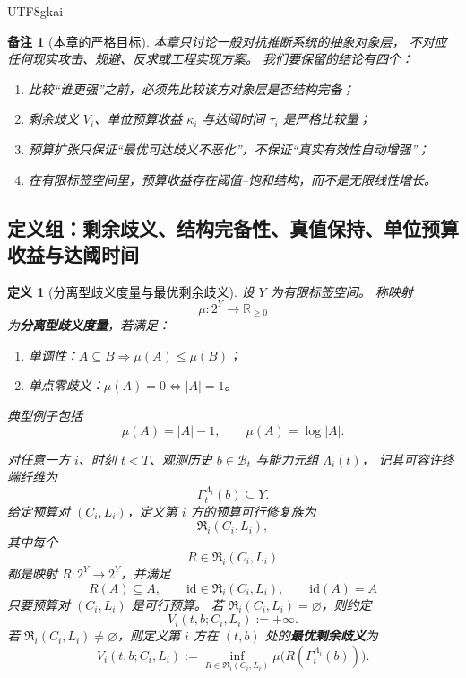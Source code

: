 \documentclass[12pt]{article}
\newtheorem{definition}{定义}[section]
\newtheorem{remark}{备注}[section]
\newcommand{\RR}{\mathbb{R}}
\newcommand{\id}{\mathrm{id}}
\begin{document}
\begin{CJK*}{UTF8}{gkai}
\begin{remark}[本章的严格目标]
本章只讨论一般对抗推断系统的抽象对象层，
不对应任何现实攻击、规避、反求或工程实现方案。
我们要保留的结论有四个：
\begin{enumerate}
  \item 比较“谁更强”之前，必须先比较该方对象层是否结构完备；
  \item 剩余歧义 $V_i$、单位预算收益 $\kappa_i$ 与达阈时间 $\tau_i$ 是严格比较量；
  \item 预算扩张只保证“最优可达歧义不恶化”，不保证“真实有效性自动增强”；
  \item 在有限标签空间里，预算收益存在阈值--饱和结构，而不是无限线性增长。
\end{enumerate}
\end{remark}

\subsection{定义组：剩余歧义、结构完备性、真值保持、单位预算收益与达阈时间}
\label{subsec:tex1-ch3-defs}

\begin{definition}[分离型歧义度量与最优剩余歧义]
\label{def:tex1-ch3-ambiguity}
设 $Y$ 为有限标签空间。
称映射
\[
  \mu:2^Y\to \RR_{\ge 0}
\]
为\textbf{分离型歧义度量}，若满足：
\begin{enumerate}
  \item 单调性：$A\subseteq B\Rightarrow \mu(A)\le \mu(B)$；
  \item 单点零歧义：$\mu(A)=0\Longleftrightarrow |A|=1$。
\end{enumerate}
典型例子包括
\[
  \mu(A)=|A|-1,
  \qquad
  \mu(A)=\log |A|.
\]

对任意一方 $i$、时刻 $t<T$、观测历史 $b\in\mathcal B_t$ 与能力元组 $\Lambda_i(t)$，
记其可容许终端纤维为
\[
  \Gamma_t^{\Lambda_i}(b)\subseteq Y.
\]
给定预算对 $(C_i,L_i)$，定义第 $i$ 方的预算可行修复族为
\[
  \mathfrak R_i(C_i,L_i),
\]
其中每个
\[
  R\in \mathfrak R_i(C_i,L_i)
\]
都是映射 $R:2^Y\to 2^Y$，并满足
\[
  R(A)\subseteq A,
  \qquad
  \id\in \mathfrak R_i(C_i,L_i),
  \qquad
  \id(A)=A
\]
只要预算对 $(C_i,L_i)$ 是可行预算。
若 $\mathfrak R_i(C_i,L_i)=\varnothing$，则约定
\[
  V_i(t,b;C_i,L_i):=+\infty.
\]
若 $\mathfrak R_i(C_i,L_i)\neq\varnothing$，则定义第 $i$ 方在 $(t,b)$ 处的\textbf{最优剩余歧义}为
\[
  V_i(t,b;C_i,L_i)
  :=
  \inf_{R\in \mathfrak R_i(C_i,L_i)}
  \mu\bigl(R(\Gamma_t^{\Lambda_i}(b))\bigr).
\]
\end{definition}


\end{CJK*}
\end{document}
